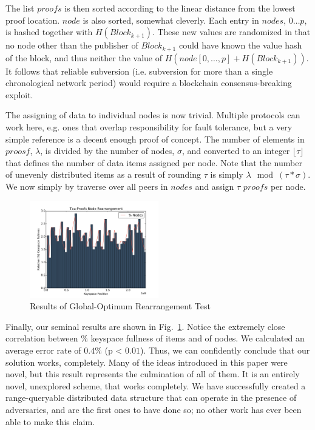 \documentclass[10pt]{IEEEtran}
\begin{document}
\par The list $proofs$ is then sorted according to the linear distance from the lowest proof location. $node$ is also sorted, somewhat cleverly. Each entry in $nodes$, $0\dots{}p$, is hashed together with $H(Block_{k+1})$. These new values are randomized in that no node other than the publisher of $Block_{k+1}$ could have known the value hash of the block, and thus neither the value of $H(node[0,\dots{},p] + H(Block_{k+1}))$. It follows that reliable subversion (i.e. subversion for more than a single chronological network period) would require a blockchain consensus-breaking exploit. 

\par The assigning of data to individual nodes is now trivial. Multiple protocols can work here, e.g. ones that overlap responsibility for fault tolerance, but a very simple reference is a decent enough proof of concept. The number of elements in $proosf$, $\lambda$, is divided by the number of nodes, $\sigma$, and converted to an integer $\lfloor{}\tau{}\rfloor{}$ that defines the number of data items assigned per node. Note that the number of unevenly distributed items as a result of rounding $\tau$ is simply  $\lambda \mod (\tau * \sigma)$. We now simply by traverse over all peers in $nodes$ and assign $\tau$ $proofs$ per node. 
\begin{figure}

\centering
\includegraphics[width=0.5\textwidth]{plots/histogram_tau}
\caption{Results of Global-Optimum Rearrangement Test}
\label{fig:Histo2}
\end{figure}

\par Finally, our seminal results are shown in Fig.~\ref{fig:Histo2}. Notice the extremely close correlation between $\%$ keyspace fullness of items and of nodes. We calculated an average error rate of $0.4\%$ (p < $0.01$). Thus, we can confidently conclude that our solution works, completely. Many of the ideas introduced in this paper were novel, but this result represents the culmination of all of them. It is an entirely novel, unexplored scheme, that works completely. We have successfully created a range-queryable distributed data structure that can operate in the presence of adversaries, and are the first ones to have done so; no other work has ever been able to make this claim.
\end{document}
